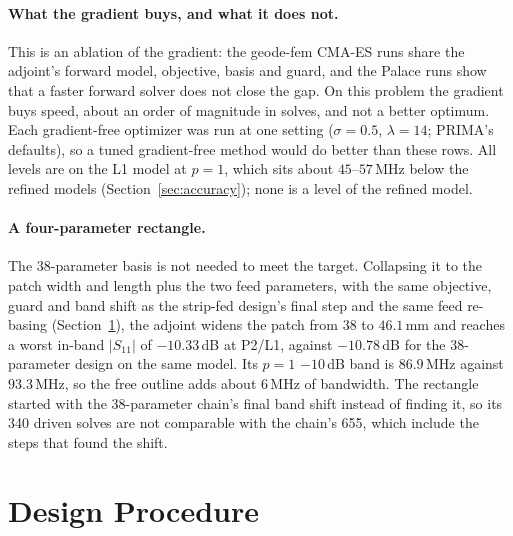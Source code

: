 \documentclass{anvil-paper}
\newcommand{\PL}{P2/L1}
\begin{document}
\paragraph{What the gradient buys, and what it does not.}
This is an ablation of the gradient: the geode-fem CMA-ES runs share the
adjoint's forward model, objective, basis and guard, and the Palace runs
show that a faster forward solver does not close the gap. On this problem
the gradient buys speed, about an order of magnitude in solves, and not a
better optimum. Each gradient-free optimizer was run at one setting
($\sigma = 0.5$, $\lambda = 14$; PRIMA's defaults), so a tuned gradient-free
method would do better than these rows. All levels are on the L1 model at
$p = 1$, which sits about $45$--$57$\,MHz below the refined models
(Section~\ref{sec:accuracy}); none is a level of the refined model.

\paragraph{A four-parameter rectangle.}
The 38-parameter basis is not needed to meet the target. Collapsing it to
the patch width and length plus the two feed parameters, with the same
objective, guard and band shift as the strip-fed design's final step and
the same feed re-basing (Section~\ref{sec:procedure}), the adjoint widens
the patch from $38$ to $46.1$\,mm and reaches a worst in-band $|S_{11}|$ of
$-10.33$\,dB at \PL{}, against $-10.78$\,dB for the 38-parameter design on
the same model. Its $p = 1$ $-10$\,dB band is $86.9$\,MHz against
$93.3$\,MHz, so the free outline adds about $6$\,MHz of bandwidth. The
rectangle started with the 38-parameter chain's final band shift instead of
finding it, so its 340 driven solves are not comparable with the chain's
655, which include the steps that found the shift.

\section{Design Procedure}
\label{sec:procedure}
\end{document}

